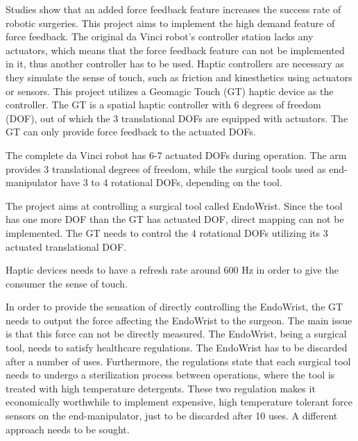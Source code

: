  Studies show that an added force feedback feature increases the success rate of robotic surgeries\cite{lack_fb}. This project aims to implement the high demand feature of force feedback. The original da Vinci robot's controller station lacks any actuators, which means that the force feedback feature can not be implemented in it, thus another controller has to be used. Haptic controllers are necessary as they simulate the sense of touch, such as friction and kinesthetics using actuators or sensors. This project utilizes a Geomagic Touch (GT) haptic device as the controller. 
{\color{red}
The GT is a spatial haptic controller with 6 degrees of freedom (DOF), out of which the 3 translational DOFs are equipped with actuators\cite{gt_spec}. The GT can only provide force feedback to the actuated DOFs.} 


{\color{red}The complete da Vinci robot has 6-7 actuated DOFs during operation. The arm provides 3 translational degrees of freedom, while the surgical tools used as end-manipulator have 3 to 4 rotational DOFs, depending on the tool.}  


The project aims at controlling a surgical tool called EndoWrist. {\color{red}Since the tool has one more DOF than the GT has actuated DOF, direct mapping can not be implemented. The GT needs to control the 4 rotational DOFs utilizing its 3 actuated translational DOF.} 

 Haptic devices needs to have a refresh rate around 600 Hz in order to give the consumer the sense of touch\cite{coles2011role}.%

In order to provide the sensation of directly controlling the EndoWrist, the GT needs to output the force affecting the EndoWrist to the surgeon. The main issue is that this force can not be directly measured. {\color{yellow}The EndoWrist, being a surgical tool, needs to satisfy healthcare regulations. The EndoWrist has to be discarded after a number of uses.}  Furthermore, the regulations state that each surgical tool needs to undergo a sterilization process between operations, where the tool is treated with high temperature detergents. {\color{red}These two regulation makes it economically worthwhile to implement expensive, high temperature tolerant force sensors on the end-manipulator, just to be discarded after 10 uses. A different approach needs to be sought.} 

